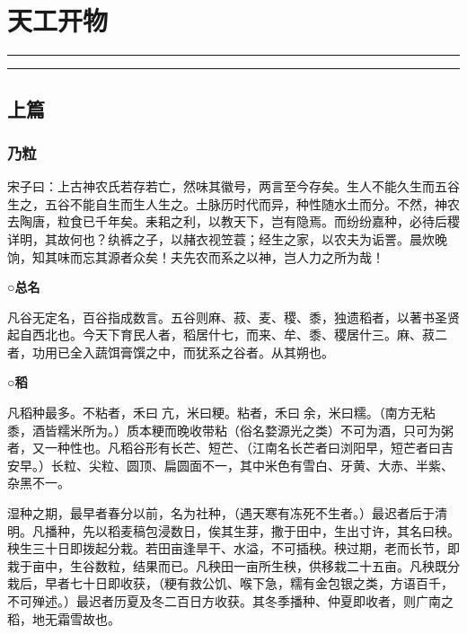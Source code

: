 \documentclass[]{article}
\date{}
\begin{document}
\hypertarget{header-n2186}{%
\section{天工开物}\label{header-n2186}}

\begin{center}\rule{0.5\linewidth}{\linethickness}\end{center}

\tableofcontents

\begin{center}\rule{0.5\linewidth}{\linethickness}\end{center}

\hypertarget{header-n2191}{%
\subsection{上篇}\label{header-n2191}}

\hypertarget{header-n2193}{%
\subsubsection{乃粒}\label{header-n2193}}

宋子曰：上古神农氏若存若亡，然味其徽号，两言至今存矣。生人不能久生而五谷生之，五谷不能自生而生人生之。土脉历时代而异，种性随水土而分。不然，神农去陶唐，粒食已千年矣。耒耜之利，以教天下，岂有隐焉。而纷纷嘉种，必待后稷详明，其故何也？纨裤之子，以赭衣视笠蓑；经生之家，以农夫为诟詈。晨炊晚饷，知其味而忘其源者众矣！夫先农而系之以神，岂人力之所为哉！

\textbf{○总名}

凡谷无定名，百谷指成数言。五谷则麻、菽、麦、稷、黍，独遗稻者，以著书圣贤起自西北也。今天下育民人者，稻居什七，而来、牟、黍、稷居什三。麻、菽二者，功用已全入蔬饵膏馔之中，而犹系之谷者。从其朔也。

\textbf{○稻}

凡稻种最多。不粘者，禾曰亢，米曰粳。粘者，禾曰余，米曰糯。（南方无粘黍，酒皆糯米所为。）质本粳而晚收带粘（俗名婺源光之类）不可为酒，只可为粥者，又一种性也。凡稻谷形有长芒、短芒、（江南名长芒者曰浏阳早，短芒者曰吉安早。）长粒、尖粒、圆顶、扁圆面不一，其中米色有雪白、牙黄、大赤、半紫、杂黑不一。

湿种之期，最早者春分以前，名为社种，（遇天寒有冻死不生者。）最迟者后于清明。凡播种，先以稻麦稿包浸数日，俟其生芽，撒于田中，生出寸许，其名曰秧。秧生三十日即拨起分栽。若田亩逢旱干、水溢，不可插秧。秧过期，老而长节，即栽于亩中，生谷数粒，结果而已。凡秧田一亩所生秧，供移栽二十五亩。凡秧既分栽后，早者七十日即收获，（粳有救公饥、喉下急，糯有金包银之类，方语百千，不可殚述。）最迟者历夏及冬二百日方收获。其冬季播种、仲夏即收者，则广南之稻，地无霜雪故也。
\end{document}
